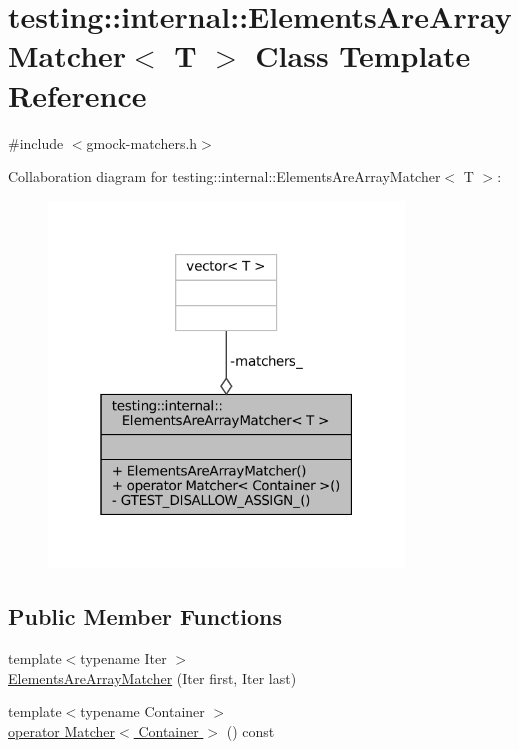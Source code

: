 \hypertarget{classtesting_1_1internal_1_1ElementsAreArrayMatcher}{}\section{testing\+:\+:internal\+:\+:Elements\+Are\+Array\+Matcher$<$ T $>$ Class Template Reference}
\label{classtesting_1_1internal_1_1ElementsAreArrayMatcher}


{\ttfamily \#include $<$gmock-\/matchers.\+h$>$}



Collaboration diagram for testing\+:\+:internal\+:\+:Elements\+Are\+Array\+Matcher$<$ T $>$\+:
\nopagebreak
\begin{figure}[H]
\begin{center}
\leavevmode
\includegraphics[width=268pt]{classtesting_1_1internal_1_1ElementsAreArrayMatcher__coll__graph}
\end{center}
\end{figure}
\subsection*{Public Member Functions}
\begin{DoxyCompactItemize}
\item 
{\footnotesize template$<$typename Iter $>$ }\\\hyperlink{classtesting_1_1internal_1_1ElementsAreArrayMatcher_aa076a0583c29dc7da6107775bba73be8}{Elements\+Are\+Array\+Matcher} (Iter first, Iter last)
\item 
{\footnotesize template$<$typename Container $>$ }\\\hyperlink{classtesting_1_1internal_1_1ElementsAreArrayMatcher_ac776db6072208f39f3eced25fb353f75}{operator Matcher$<$ Container $>$} () const
\end{DoxyCompactItemize}
